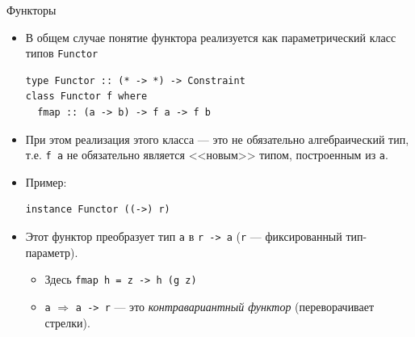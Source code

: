 \documentclass[xcolor=dvipsnames]{beamer}
\begin{document}
\begin{frame}[fragile]{Функторы}

\begin{itemize}[<+->]
 \item В общем случае понятие функтора реализуется как параметрический класс типов \texttt{Functor}
 
 {\footnotesize
\begin{verbatim}
type Functor :: (* -> *) -> Constraint
class Functor f where
  fmap :: (a -> b) -> f a -> f b 
\end{verbatim}

 }
 \item При этом реализация этого класса --- это не обязательно алгебраический тип, т.е. \texttt{f a} не обязательно является <<новым>> типом, построенным из \texttt{a}.
 \item Пример:
 
{\footnotesize
 \begin{verbatim}
instance Functor ((->) r)
 \end{verbatim}

 }
 
 \item Этот функтор преобразует тип \texttt{a} в \texttt{r -> a} (\texttt{r} --- фиксированный тип-параметр).
 \begin{itemize}
 \item Здесь \texttt{fmap h = \g z -> h (g z)}
 \item \texttt{a} $\Rightarrow$ \texttt{a -> r} --- это {\em контравариантный функтор} (переворачивает стрелки).
 \end{itemize}
\end{itemize}

 
\end{frame}
\end{document}
